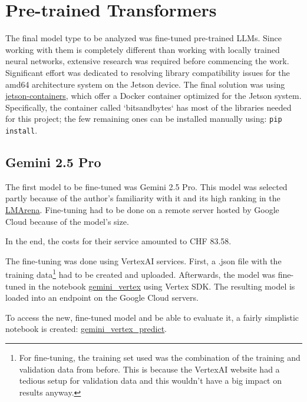 \documentclass{article}
\begin{document}
\section{Pre-trained Transformers}

The final model type to be analyzed was fine-tuned pre-trained LLMs. Since working with them is completely different than working with locally trained neural networks, extensive research was required before commencing the work.
\\[1em]
Significant effort was dedicated to resolving library compatibility issues for the amd64 architecture system on the Jetson device. The final solution was using \href{https://github.com/dusty-nv/jetson-containers}{jetson-containers}, which offer a Docker container optimized for the Jetson system. Specifically, the container called `bitsandbytes` has most of the libraries needed for this project; the few remaining ones can be installed manually using: \texttt{pip install}.


\subsection{Gemini 2.5 Pro}
The first model to be fine-tuned was Gemini 2.5 Pro. This model was selected partly because of the author's familiarity with it and its high ranking in the \href{https://lmarena.ai/leaderboard}{LMArena}.
Fine-tuning had to be done on a remote server hosted by Google Cloud because of the model's size.

In the end, the costs for their service amounted to CHF 83.58.

The fine-tuning was done using VertexAI services. First, a .json file with the training data\footnote{For fine-tuning, the training set used was the combination of the training and validation data from before. This is because the VertexAI website had a tedious setup for validation data and this wouldn't have a big impact on results anyway.} had to be created and uploaded. Afterwards, the model was fine-tuned in the notebook \href{https://github.com/AntonStantan/matura/blob/main/pre-trained-tranformers/gemini_vertex.ipynb}{gemini\_vertex} using Vertex SDK. The resulting model is loaded into an endpoint on the Google Cloud servers.

To access the new, fine-tuned model and be able to evaluate it, a fairly simplistic notebook is created: \href{https://github.com/AntonStantan/matura/blob/main/pre-trained-tranformers/gemini_vertex_predict.ipynb}{gemini\_vertex\_predict}.
\end{document}
